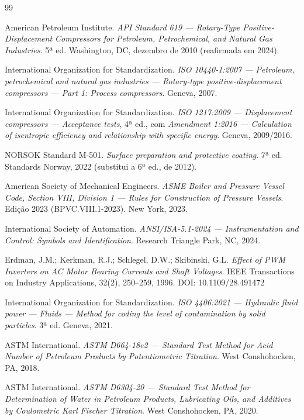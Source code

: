 \documentclass[12pt,a4paper]{article}
\numberwithin{equation}{section}
\numberwithin{table}{section}
\numberwithin{figure}{section}
\begin{document}
\newpage
\begin{thebibliography}{99}

 American Petroleum Institute. \textit{API Standard 619 — Rotary-Type Positive-Displacement Compressors for Petroleum, Petrochemical, and Natural Gas Industries}. 5ª ed. Washington, DC, dezembro de 2010 (reafirmada em 2024).

 International Organization for Standardization. \textit{ISO 10440-1:2007 — Petroleum, petrochemical and natural gas industries — Rotary-type positive-displacement compressors — Part 1: Process compressors}. Geneva, 2007.

 International Organization for Standardization. \textit{ISO 1217:2009 — Displacement compressors — Acceptance tests}, 4ª ed., com \textit{Amendment 1:2016 — Calculation of isentropic efficiency and relationship with specific energy}. Geneva, 2009/2016.

 NORSOK Standard M-501. \textit{Surface preparation and protective coating}. 7ª ed. Standards Norway, 2022 (substitui a 6ª ed., de 2012).

 American Society of Mechanical Engineers. \textit{ASME Boiler and Pressure Vessel Code, Section VIII, Division 1 — Rules for Construction of Pressure Vessels}. Edição 2023 (BPVC.VIII.1-2023). New York, 2023.

 International Society of Automation. \textit{ANSI/ISA-5.1-2024 — Instrumentation and Control: Symbols and Identification}. Research Triangle Park, NC, 2024.

 Erdman, J.M.; Kerkman, R.J.; Schlegel, D.W.; Skibinski, G.L. \textit{Effect of PWM Inverters on AC Motor Bearing Currents and Shaft Voltages}. IEEE Transactions on Industry Applications, 32(2), 250–259, 1996. DOI: 10.1109/28.491472

 International Organization for Standardization. \textit{ISO 4406:2021 — Hydraulic fluid power — Fluids — Method for coding the level of contamination by solid particles}. 3ª ed. Geneva, 2021.

 ASTM International. \textit{ASTM D664-18e2 — Standard Test Method for Acid Number of Petroleum Products by Potentiometric Titration}. West Conshohocken, PA, 2018.

 ASTM International. \textit{ASTM D6304-20 — Standard Test Method for Determination of Water in Petroleum Products, Lubricating Oils, and Additives by Coulometric Karl Fischer Titration}. West Conshohocken, PA, 2020.


\end{thebibliography}
\end{document}
